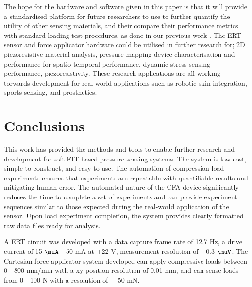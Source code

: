 The hope for the hardware and software given in this paper is that it will provide a standardised platform for future researchers to use to further quantify the utility of other sensing materials, and their compare their performance metrics with standard loading test procedures, as done in our previous work \cite{Ellingham2024}. The ERT sensor and force applicator hardware could be utilised in further research for; 2D piezoresistive material analysis, pressure mapping device characterisation and performance for spatio-temporal performance, dynamic stress sensing performance, piezoresistivity. These research applications are all working torwards development for real-world applications such as robotic skin integration, sports sensing, and prosthetics.





\section{Conclusions}
This work has provided the methods and tools to enable further research and development for soft EIT-based pressure sensing systems. The system is low cost, simple to construct, and easy to use. The automation of compression load experiments ensures that experiments are repeatable with quantifiable results and mitigating human error. The automated nature of the CFA device significantly reduces the time to complete a set of experiments and can provide experiment sequences similar to those expected during the real-world application of the sensor. Upon load experiment completion, the system provides clearly formatted raw data files ready for analysis.

A ERT circuit was developed with a data capture frame rate of 12.7 Hz, a drive current of 15 $\mathrm{\muA}$ - 50 mA at $\pm$22 V, measurement resolution of $\pm$0.3 $\mathrm{\muV}$. The Cartesian force applicator system developed can apply compressive loads between 0 - 800 mm/min with a xy position resolution of 0.01 mm, and can sense loads from 0 - 100 N with a resolution of $\pm$ 50 mN.

